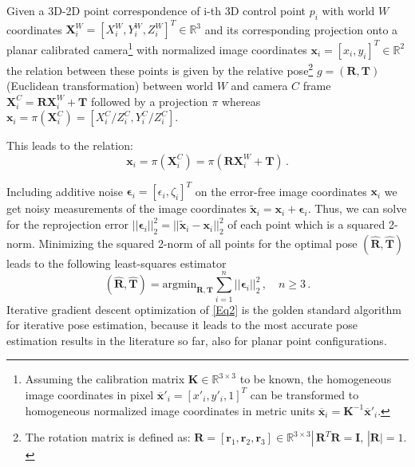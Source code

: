 \documentclass[letterpaper, 10 pt, conference]{ieeeconf}  %
\begin{document}
	Given a 3D-2D point correspondence of i-th 3D control point $p_i$ with world $W$ coordinates 
	$\mathbf{X}_i^{W} = [X_i^{W}, Y_i^{W}, Z_i^{W}]^T \in \mathbb{R}^3$ and its corresponding projection onto a planar calibrated camera\footnote{Assuming the calibration matrix $\mathbf{K} \in \mathbb{R}^{3\times 3}$ to be known, the homogeneous image coordinates in pixel 
		$\overline{\mathbf{x}}'_i = [x'_i, y'_i, 1]^T$ can be transformed to homogeneous normalized image coordinates in metric units 
		$\overline{\mathbf{x}}_i = \mathbf{K}^{-1}\overline{\mathbf{x}}'_i$.} with normalized image coordinates $\mathbf{x}_i = [x_i, y_i]^T \in \mathbb{R}^2$ the relation between these points is given by the relative pose\footnote{The rotation matrix is defined as: $\mathbf{R} = [\mathbf{r}_1, \mathbf{r}_2, \mathbf{r}_3] \in \mathbb{R}^{3 \times 3} |\,  \mathbf{R}^T\mathbf{R} = \mathbf{I},\, |\mathbf{R}|=1.$ } 
	$g = (\mathbf{R}, \mathbf{T})$ (Euclidean transformation) between world $W$ and camera $C$ frame $\mathbf{X}_i^{C} = \mathbf{R}\mathbf{X}_i^{W}+\mathbf{T}$
	followed by a projection $\pi$ whereas $\mathbf{x}_i = \pi(\mathbf{X}_i^{C}) = [X_i^{C}/Z_i^{C}, Y_i^{C}/Z_i^{C}]$.
	
	This leads to the relation:
	\begin{equation}
	\label{Eq1}
	\mathbf{x}_i = \pi(\mathbf{X}_i^{C}) = \pi(\mathbf{R}\mathbf{X}_i^{W}+\mathbf{T})\,.
	\end{equation}
	
	Including additive noise $\bm{\epsilon}_i = [\epsilon_i, \zeta_i]^T$ on the error-free image coordinates $\mathbf{x}_i$ we get noisy measurements of the image coordinates
	$\tilde{\mathbf{x}}_i = \mathbf{x}_i + \bm{\epsilon}_i$.
	Thus, we can solve for the reprojection error $|\!|\bm{\epsilon}_i|\!|_2^2 = |\!|\tilde{\mathbf{x}}_i - \mathbf{x}_i|\!|_2^2$ of each point
	which is a squared 2-norm. Minimizing the squared 2-norm of all points for the optimal pose $(\hat{\mathbf{R}}, \hat{\mathbf{T}})$ leads to the following least-squares estimator
	\begin{equation}
	\label{Eq2}
	(\hat{\mathbf{R}}, \hat{\mathbf{T}}) = \text{argmin}_{\mathbf{R}, \mathbf{T}} 
	\sum\limits_{i=1}^n |\!|\bm{\epsilon}_i|\!|_2^2\, , \quad n \geq 3 \,.
	\end{equation}
	Iterative gradient descent optimization of \eqref{Eq2} is the golden standard algorithm for iterative pose estimation, because it leads to the most accurate pose estimation results in the literature so far,
	also for planar point configurations.
	
\end{document}
